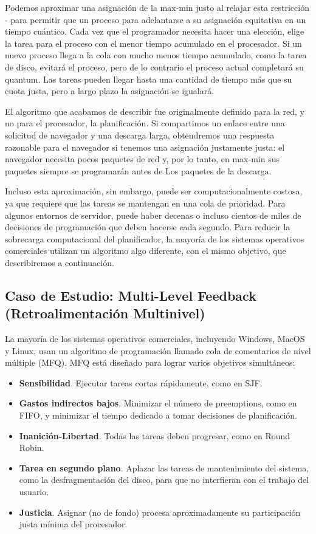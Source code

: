 \documentclass[10pt]{book}
\begin{document}
Podemos aproximar una asignación de la max-min justo al relajar esta restricción - para permitir que un proceso para adelantarse a su asignación equitativa en un tiempo cuántico. Cada vez que el programador necesita hacer una elección, elige la tarea para el proceso con el menor tiempo acumulado en el procesador. Si un nuevo proceso llega a la cola con mucho menos tiempo acumulado, como la tarea de disco, evitará el proceso, pero de lo contrario el proceso actual completará su quantum. Las tareas pueden llegar hasta una cantidad de tiempo más que su cuota justa, pero a largo plazo la asignación se igualará.

El algoritmo que acabamos de describir fue originalmente definido para la red, y no para el procesador, la planificación. Si compartimos un enlace entre una solicitud de navegador y una descarga larga, obtendremos una respuesta razonable para el navegador si tenemos una asignación justamente justa: el navegador necesita pocos paquetes de red y, por lo tanto, en max-min sus paquetes siempre se programarán antes de Los paquetes de la descarga.

Incluso esta aproximación, sin embargo, puede ser computacionalmente costosa, ya que requiere que las tareas se mantengan en una cola de prioridad. Para algunos entornos de servidor, puede haber decenas o incluso cientos de miles de decisiones de programación que deben hacerse cada segundo. Para reducir la sobrecarga computacional del planificador, la mayoría de los sistemas operativos comerciales utilizan un algoritmo algo diferente, con el mismo objetivo, que describiremos a continuación.

\subsection{Caso de Estudio: Multi-Level Feedback (Retroalimentación Multinivel)}
La mayoría de los sistemas operativos comerciales, incluyendo Windows, MacOS y Linux, usan un algoritmo de programación llamado cola de comentarios de nivel múltiple (MFQ). MFQ está diseñado para lograr varios objetivos simultáneos:
\begin{itemize}
\item \textbf{Sensibilidad}. Ejecutar tareas cortas rápidamente, como en SJF.
\item \textbf{Gastos indirectos bajos}. Minimizar el número de preemptions, como en FIFO, y minimizar el tiempo dedicado a tomar decisiones de planificación.
\item \textbf{Inanición-Libertad}. Todas las tareas deben progresar, como en Round Robin.
\item \textbf{Tarea en segundo plano}. Aplazar las tareas de mantenimiento del sistema, como la desfragmentación del disco, para que no interfieran con el trabajo del usuario.
\item \textbf{Justicia}. Asignar (no de fondo) procesa aproximadamente su participación justa mínima del procesador.
\end{itemize}
\end{document}
